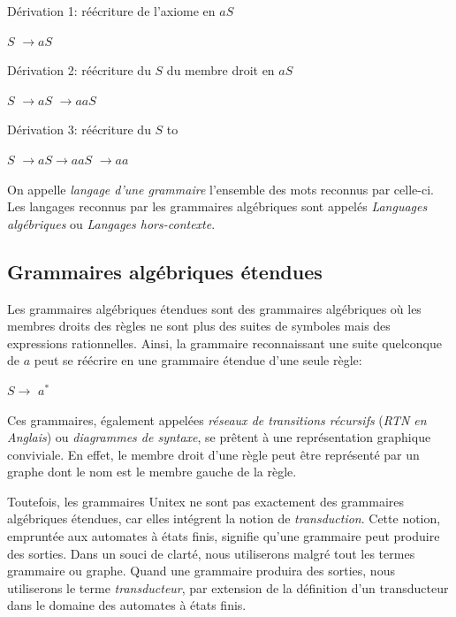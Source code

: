 \bigskip Dérivation 1: réécriture de l’axiome en $aS$

\underline{$S$} $\rightarrow aS$

\bigskip Dérivation 2: réécriture du $S$ du membre droit en $aS$

$S$ $\rightarrow a$\underline{$S$} $\rightarrow aaS$

\bigskip Dérivation 3: réécriture du $S$ to \E

$S$ $\rightarrow aS \rightarrow aa$\underline{$S$} $\rightarrow aa$

\bigskip
\noindent On appelle \textit{langage d’une grammaire} l’ensemble des mots reconnus par celle-ci.
Les langages reconnus par les grammaires algébriques sont appelés \textit{Languages algébriques}
 ou \textit{Langages hors-contexte}.


\subsection{Grammaires algébriques étendues}

   Les grammaires algébriques étendues sont des grammaires algébriques où les membres
droits des règles ne sont plus des suites de symboles mais des expressions rationnelles.
 Ainsi, la grammaire reconnaissant une suite quelconque de $a$
peut se réécrire en une grammaire étendue d’une seule règle:


\bigskip $S \rightarrow$ $a^{*}$

\bigskip
\noindent Ces grammaires, également appelées \textit{réseaux de transitions récursifs}
(\textit{RTN en Anglais}) ou
\textit{diagrammes de syntaxe}, se prêtent à une représentation graphique
conviviale. En effet, le membre droit d’une règle peut être représenté par un graphe dont le nom
est le membre gauche de la règle.


\bigskip
\noindent Toutefois, les grammaires Unitex ne sont pas exactement des grammaires algébriques
étendues, car elles intégrent la notion de \textit{transduction}. Cette notion,
empruntée aux automates à états finis, signifie qu’une grammaire peut produire des sorties.
Dans un souci de clarté, nous utiliserons malgré tout les termes grammaire ou graphe.
Quand une grammaire produira des sorties, nous utiliserons le terme \textit{transducteur},
 par extension de la définition d’un transducteur dans le domaine des automates
à états finis.


